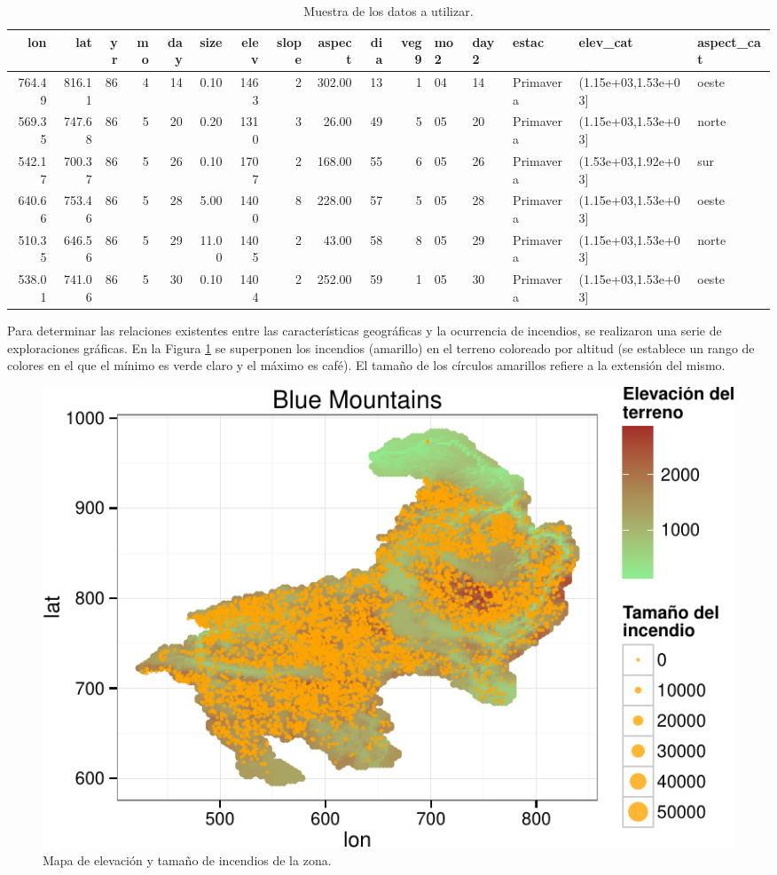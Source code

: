 \documentclass[12,]{article}
\begin{document}
\begin{table}[H]
\centering
{\tiny
\begin{tabular}{rrrrrrrrrrrlllll}
  \hline
lon & lat & yr & mo & day & size & elev & slope & aspect & dia & veg9 & mo2 & day2 & estac & elev\_cat & aspect\_cat \\
  \hline
764.49 & 816.11 &  86 &   4 &  14 & 0.10 & 1463 &   2 & 302.00 &  13 &   1 & 04 & 14 & Primavera & (1.15e+03,1.53e+03] & oeste \\
  569.35 & 747.68 &  86 &   5 &  20 & 0.20 & 1310 &   3 & 26.00 &  49 &   5 & 05 & 20 & Primavera & (1.15e+03,1.53e+03] & norte \\
  542.17 & 700.37 &  86 &   5 &  26 & 0.10 & 1707 &   2 & 168.00 &  55 &   6 & 05 & 26 & Primavera & (1.53e+03,1.92e+03] & sur \\
  640.66 & 753.46 &  86 &   5 &  28 & 5.00 & 1400 &   8 & 228.00 &  57 &   5 & 05 & 28 & Primavera & (1.15e+03,1.53e+03] & oeste \\
  510.35 & 646.56 &  86 &   5 &  29 & 11.00 & 1405 &   2 & 43.00 &  58 &   8 & 05 & 29 & Primavera & (1.15e+03,1.53e+03] & norte \\
  538.01 & 741.06 &  86 &   5 &  30 & 0.10 & 1404 &   2 & 252.00 &  59 &   1 & 05 & 30 & Primavera & (1.15e+03,1.53e+03] & oeste \\
   \hline
\end{tabular}
}
\caption{Muestra de los datos a utilizar.}
\end{table}

Para determinar las relaciones existentes entre las características
geográficas y la ocurrencia de incendios, se realizaron una serie de
exploraciones gráficas. En la Figura \ref{mapaincendios} se superponen
los incendios (amarillo) en el terreno coloreado por altitud (se
establece un rango de colores en el que el mínimo es verde claro y el
máximo es café). El tamaño de los círculos amarillos refiere a la
extensión del mismo.

\begin{figure}[H]
\centering
\includegraphics{tarea2_files/figure-latex/mapaincendios-1.pdf}
\caption{Mapa de elevación y tamaño de incendios de la zona.}
\label{mapaincendios}
\end{figure}
\end{document}
